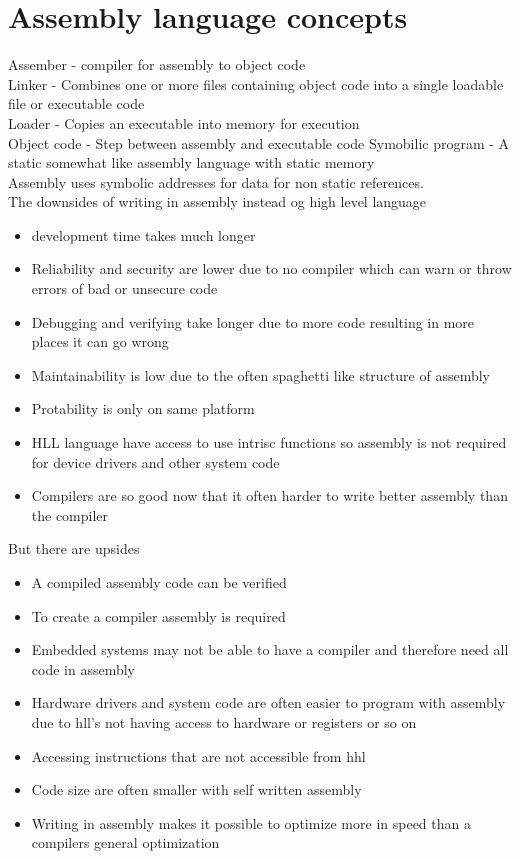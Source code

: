 \documentclass[12pt, a4paper]{article}
\begin{document}
	\section{Assembly language concepts}
		Assember - compiler for assembly to object code\\
		Linker - Combines one or more files containing object code into a single loadable file or executable code\\
		Loader - Copies an executable into memory for execution\\
		Object code - Step between assembly and executable code
		Symobilic program - A static somewhat like assembly language with static memory\\
		Assembly uses symbolic addresses for data for non static references.\\
		The downsides of writing in assembly instead og high level language
		\begin{itemize}
			\item development time takes much longer
			\item Reliability and security are lower due to no compiler which can warn or throw errors of bad or unsecure code
			\item Debugging and verifying take longer due to more code resulting in more places it can go wrong
			\item Maintainability is low due to the often spaghetti like structure of assembly
			\item Protability is only on same platform
			\item HLL language have access to use intrisc functions so assembly is not required for device drivers and other system code
			\item Compilers are so good now that it often harder to write better assembly than the compiler
		\end{itemize}
		But there are upsides
		\begin{itemize}
			\item A compiled assembly code can be verified
			\item To create a compiler assembly is required
			\item Embedded systems may not be able to have a compiler and therefore need all code in assembly
			\item Hardware drivers and system code are often easier to program with assembly due to hll's not having access to hardware or registers or so on
			\item Accessing instructions that are not accessible from hhl
			\item Code size are often smaller with self written assembly
			\item Writing in assembly makes it possible to optimize more in speed than a compilers general optimization
		\end{itemize}
\end{document}
